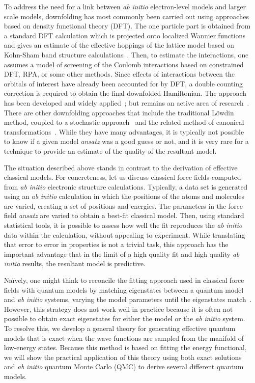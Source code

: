 \documentclass[aps, prb, 11pt]{revtex4-1}
\begin{document}
To address the need for a link between {\it ab initio} electron-level models and larger scale models, downfolding has most commonly been carried out using approaches based on density functional theory (DFT). 
The one particle part is obtained from a standard DFT calculation which is projected onto localized Wannier functions and gives an estimate of the effective hoppings of the lattice model based on Kohn-Sham band structure calculations~\cite{Pavirini}. 
Then, to estimate the interactions, one assumes a model of screening of the Coulomb interactions based on constrained DFT, RPA, or some other methods. 
Since effects of interactions between the orbitals of interest have already been accounted for by DFT, a double counting correction is required to obtain the final downfolded Hamiltonian. 
The approach has been developed and widely applied~\cite{Pavirini, Dasgupta, Aryasetiawan2004, Jeschke2013}; but remains an active area of research~\cite{Haule_doublecounting}.
There are other downfolding approaches that include the traditional L\"owdin method, coupled to a stochastic approach~\cite{Tenno,Zhou_Ceperley} and the related method of canonical transformations~\cite{White_CT, Yanai_CT}. 
While they have many advantages, it is typically not possible to know if a given model {\it ansatz} was a good guess or not, and it is very rare for a technique to provide an estimate of the quality of the resultant model. 

The situation described above stands in contrast to the derivation of effective classical models. 
For concreteness, let us discuss classical force fields computed from {\it ab initio} electronic structure calculations. 
Typically, a data set is generated using an {\it ab initio} calculation in which the positions of the atoms and molecules are varied, creating a set of positions and energies. 
The parameters in the force field {\it ansatz} are varied to obtain a best-fit classical model.
Then, using standard statistical tools, it is possible to assess how well the fit reproduces the {\it ab initio} data within the calculation, without appealing to experiment. 
While translating that error to error in properties is not a trivial task, this approach has the important advantage that in the limit of a high quality fit and high quality {\it ab initio} results, the resultant model is predictive.

Na\"ively, one might think to reconcile the fitting approach used in classical force fields with quantum models by matching eigenstates between a quantum model and {\it ab initio} systems, varying the model parameters until the eigenstates match~\cite{Wagner2013}. 
However, this strategy does not work well in practice because it is often not possible to obtain exact eigenstates for either the model or the {\it ab initio} system.
To resolve this, we develop a general theory for generating effective quantum models that is exact when the wave functions are sampled from the manifold of low-energy states. 
Because this method is based on fitting the energy functional, we will show the practical application of this theory using both exact solutions and {\it ab initio} quantum Monte Carlo (QMC) to derive several different quantum models.
\end{document}
